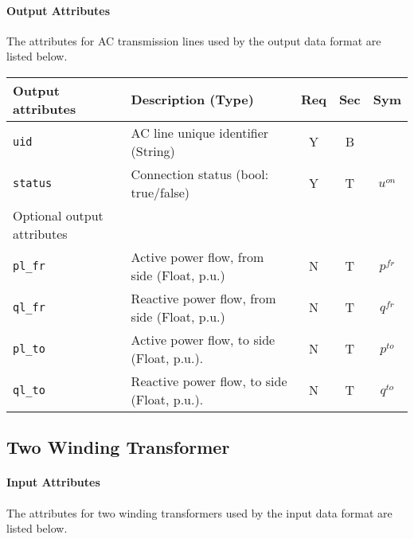 \documentclass{article}
\begin{document}
\paragraph{Output Attributes}
The attributes for AC transmission lines used by the output data format are listed below.
\begin{center}
\small
\begin{tabular}{ l | l | c | c | c |}
Output attributes & Description (Type)& Req & Sec & Sym\\
\hline
 {\tt uid} & AC line unique identifier (String)& Y & B & \\
 {\tt status} & Connection status (bool: true/false) & Y & T & $u^{on}$ \\  
\hline
  Optional output attributes &   &  & & \\
\hline
 {\tt pl\_fr} & Active power flow, from side (Float, p.u.)  & N & T & $p^{fr}$ \\
 {\tt ql\_fr} & Reactive power flow, from side (Float, p.u.)& N & T & $q^{fr}$ \\
 {\tt pl\_to} & Active power flow, to side (Float, p.u.).   & N & T & $p^{to}$ \\
 {\tt ql\_to} & Reactive power flow, to side (Float, p.u.). & N & T & $q^{to}$ \\
\hline 
\end{tabular}
\end{center}
\subsection{Two Winding Transformer}
\label{nom:transformer}

\paragraph{Input Attributes}
The attributes for two winding transformers used by the
input data format are listed below.
\end{document}
